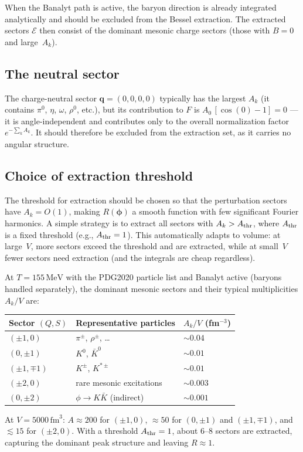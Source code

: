 \documentclass[11pt,a4paper]{article}
\newcommand{\fm}{\,\text{fm}}
\newcommand{\MeV}{\,\text{MeV}}
\newcommand{\bphi}{\bm{\phi}}
\newcommand{\bq}{\bm{q}}
\begin{document}
When the Banalyt path is active, the baryon direction is already integrated analytically and should be excluded from the Bessel extraction.
The extracted sectors $\mathcal{E}$ then consist of the dominant mesonic charge sectors (those with $B = 0$ and large~$A_k$).

\subsection{The neutral sector}
\label{sec:neutral-sector}

The charge-neutral sector $\bq = (0, 0, 0, 0)$ typically has the largest $A_k$ (it contains $\pi^0$, $\eta$, $\omega$, $\rho^0$, etc.), but its contribution to $F$ is $A_0\,[\cos(0) - 1] = 0$ --- it is angle-independent and contributes only to the overall normalization factor $e^{-\sum_k A_k}$.
It should therefore be excluded from the extraction set, as it carries no angular structure.

\subsection{Choice of extraction threshold}
\label{sec:threshold}

The threshold for extraction should be chosen so that the perturbation sectors have $A_k = O(1)$, making $R(\bphi)$ a smooth function with few significant Fourier harmonics.
A simple strategy is to extract all sectors with $A_k > A_{\rm thr}$, where $A_{\rm thr}$ is a fixed threshold (e.g., $A_{\rm thr} = 1$).
This automatically adapts to volume: at large~$V$, more sectors exceed the threshold and are extracted, while at small~$V$ fewer sectors need extraction (and the integrals are cheap regardless).

At $T = 155\MeV$ with the PDG2020 particle list and Banalyt active (baryons handled separately), the dominant mesonic sectors and their typical multiplicities $A_k/V$ are:
\begin{center}
\begin{tabular}{lll}
\toprule
Sector $(Q, S)$ & Representative particles & $A_k / V$ (fm$^{-3}$) \\
\midrule
$(\pm 1, 0)$ & $\pi^\pm$, $\rho^\pm$, \ldots & $\sim 0.04$ \\
$(0, \pm 1)$ & $K^0$, $\bar{K}^0$ & $\sim 0.01$ \\
$(\pm 1, \mp 1)$ & $K^\pm$, $K^{*\pm}$ & $\sim 0.01$ \\
$(\pm 2, 0)$ & rare mesonic excitations & $\sim 0.003$ \\
$(0, \pm 2)$ & $\phi \to K\bar{K}$ (indirect) & $\sim 0.001$ \\
\bottomrule
\end{tabular}
\end{center}
At $V = 5000\fm^3$: $A \approx 200$ for $(\pm 1, 0)$, $\approx 50$ for $(0, \pm 1)$ and $(\pm 1, \mp 1)$, and $\lesssim 15$ for $(\pm 2, 0)$.
With a threshold $A_{\rm thr} = 1$, about 6--8 sectors are extracted, capturing the dominant peak structure and leaving $R \approx 1$.
\end{document}
